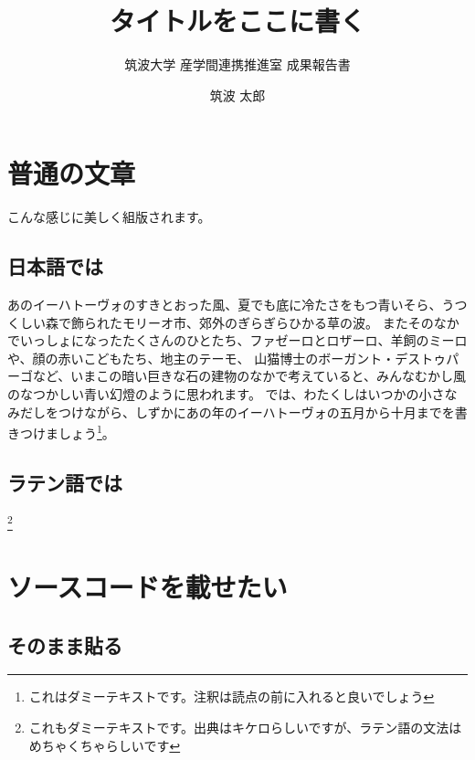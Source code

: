 \documentclass[twocolumn]{jlreq}
\subtitle{筑波大学 産学間連携推進室 成果報告書}%
\title{タイトルをここに書く} %
\author{筑波 太郎} %
\date{} %
\begin{document}
\section{普通の文章}

こんな感じに美しく組版されます。

\subsection{日本語では}

あのイーハトーヴォのすきとおった風、夏でも底に冷たさをもつ青いそら、うつくしい森で飾られたモリーオ市、郊外のぎらぎらひかる草の波。
またそのなかでいっしょになったたくさんのひとたち、ファゼーロとロザーロ、羊飼のミーロや、顔の赤いこどもたち、地主のテーモ、
山猫博士のボーガント・デストゥパーゴなど、いまこの暗い巨きな石の建物のなかで考えていると、みんなむかし風のなつかしい青い幻燈のように思われます。
では、わたくしはいつかの小さなみだしをつけながら、しずかにあの年のイーハトーヴォの五月から十月までを書きつけましょう\footnote{これはダミーテキストです。注釈は読点の前に入れると良いでしょう}。

\subsection{ラテン語では}

\lipsum[1]\footnote{これもダミーテキストです。出典はキケロらしいですが、ラテン語の文法はめちゃくちゃらしいです}

\section{ソースコードを載せたい}

\subsection{そのまま貼る}
\end{document}
